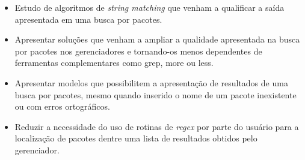 
\begin{itemize}
	\item Estudo de algoritmos de \textit{string matching} que venham a qualificar a saída apresentada em uma busca por pacotes.
	\item Apresentar soluções que venham a ampliar a qualidade apresentada na busca por pacotes nos gerenciadores e tornando-os menos dependentes de ferramentas complementares como {\code grep}, {\code more} ou {\code less}.
	\item Apresentar modelos que possibilitem a apresentação de resultados de uma busca por pacotes, mesmo quando inserido o nome de um pacote inexistente ou com erros ortográficos.
	\item Reduzir a necessidade do uso de rotinas de \textit{regex} por parte do usuário para a localização de pacotes dentre uma lista de resultados obtidos pelo gerenciador.
\end{itemize}